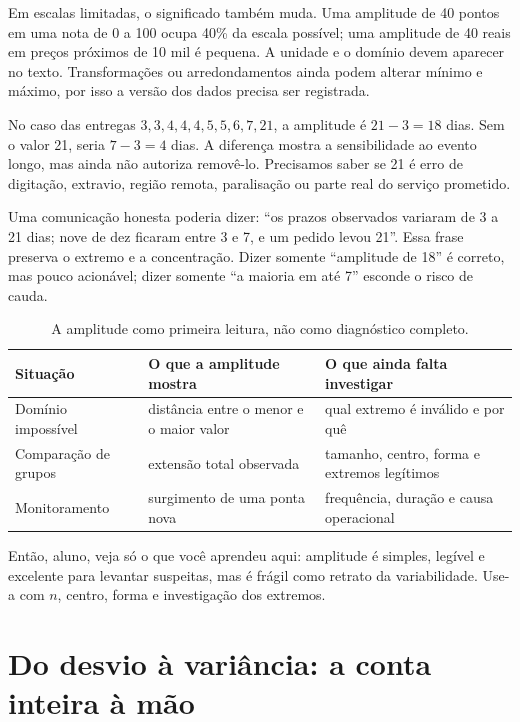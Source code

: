 Em escalas limitadas, o significado também muda. Uma amplitude de 40 pontos em uma nota de 0 a 100 ocupa 40\% da escala possível; uma amplitude de 40 reais em preços próximos de 10 mil é pequena. A unidade e o domínio devem aparecer no texto. Transformações ou arredondamentos ainda podem alterar mínimo e máximo, por isso a versão dos dados precisa ser registrada.

No caso das entregas $3,3,4,4,4,5,5,6,7,21$, a amplitude é $21-3=18$ dias. Sem o valor 21, seria $7-3=4$ dias. A diferença mostra a sensibilidade ao evento longo, mas ainda não autoriza removê-lo. Precisamos saber se 21 é erro de digitação, extravio, região remota, paralisação ou parte real do serviço prometido.

Uma comunicação honesta poderia dizer: ``os prazos observados variaram de 3 a 21 dias; nove de dez ficaram entre 3 e 7, e um pedido levou 21''. Essa frase preserva o extremo e a concentração. Dizer somente ``amplitude de 18'' é correto, mas pouco acionável; dizer somente ``a maioria em até 7'' esconde o risco de cauda.

\begin{table}[htbp]
\centering
\small
\caption{A amplitude como primeira leitura, não como diagnóstico completo.}
\label{tab:amplitude-limites}
\begin{tabularx}{0.94\textwidth}{@{}p{2.8cm}YY@{}}
\toprule
\textbf{Situação} & \textbf{O que a amplitude mostra} & \textbf{O que ainda falta investigar} \\
\midrule
Domínio impossível & distância entre o menor e o maior valor & qual extremo é inválido e por quê \\
Comparação de grupos & extensão total observada & tamanho, centro, forma e extremos legítimos \\
Monitoramento & surgimento de uma ponta nova & frequência, duração e causa operacional \\
\bottomrule
\end{tabularx}
\end{table}

\begin{SummaryBox}
Então, aluno, veja só o que você aprendeu aqui: amplitude é simples, legível e excelente para levantar suspeitas, mas é frágil como retrato da variabilidade. Use-a com $n$, centro, forma e investigação dos extremos.
\end{SummaryBox}

\section{Do desvio à variância: a conta inteira à mão}

